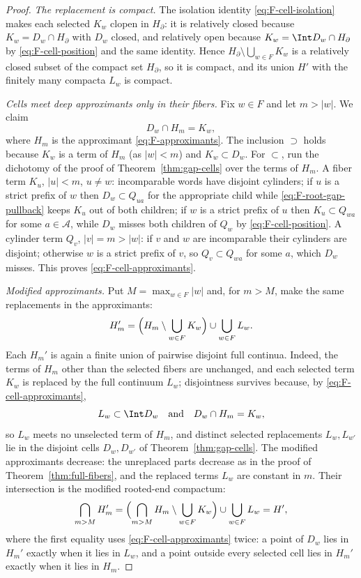 \begin{proof}
\emph{The replacement is compact.}
The isolation identity \eqref{eq:F-cell-isolation} makes each selected
$K_w$ clopen in $H_\partial$: it is relatively closed because
$K_w=D_w\cap H_\partial$ with $D_w$ closed, and relatively open because
$K_w=\Int D_w\cap H_\partial$ by \eqref{eq:F-cell-position} and the same
identity.  Hence $H_\partial\setminus\bigcup_{w\in F}K_w$ is a relatively
closed subset of the compact set $H_\partial$, so it is compact, and its
union $H'$ with the finitely many compacta $L_w$ is compact.

\emph{Cells meet deep approximants only in their fibers.}
Fix $w\in F$ and let $m>|w|$.  We claim
\begin{equation}\label{eq:F-cell-approximants}
D_w\cap H_m=K_w ,
\end{equation}
where $H_m$ is the approximant \eqref{eq:F-approximants}.  The inclusion
$\supset$ holds because $K_w$ is a term of $H_m$ (as $|w|<m$) and
$K_w\subset D_w$.  For $\subset$, run the dichotomy of the proof of
Theorem~\ref{thm:gap-cells} over the terms of $H_m$.  A fiber term $K_u$,
$|u|<m$, $u\ne w$: incomparable words have disjoint cylinders; if $u$ is
a strict prefix of $w$ then $D_w\subset Q_{ua}$ for the appropriate child
while \eqref{eq:F-root-gap-pullback} keeps $K_u$ out of both children; if
$w$ is a strict prefix of $u$ then $K_u\subset Q_{wa}$ for some
$a\in\mathcal A$, while $D_w$ misses both children of $Q_w$ by
\eqref{eq:F-cell-position}.  A cylinder term $Q_v$, $|v|=m>|w|$: if $v$
and $w$ are incomparable their cylinders are disjoint; otherwise $w$ is a
strict prefix of $v$, so $Q_v\subset Q_{wa}$ for some $a$, which $D_w$
misses.  This proves \eqref{eq:F-cell-approximants}.

\emph{Modified approximants.}
Put $M=\max_{w\in F}|w|$ and, for $m>M$, make the same replacements in
the approximants:
\[
H_m'
=\Bigl(H_m\setminus\bigcup_{w\in F}K_w\Bigr)
\cup\bigcup_{w\in F}L_w .
\]
Each $H_m'$ is again a finite union of pairwise disjoint full continua.
Indeed, the terms of $H_m$ other than the selected fibers are unchanged,
and each selected term $K_w$ is replaced by the full continuum $L_w$;
disjointness survives because, by \eqref{eq:F-cell-approximants},
\[
L_w\subset\Int D_w
\quad\text{and}\quad
D_w\cap H_m=K_w ,
\]
so $L_w$ meets no unselected term of $H_m$, and distinct selected
replacements $L_w,L_{w'}$ lie in the disjoint cells $D_w,D_{w'}$ of
Theorem~\ref{thm:gap-cells}.  The modified approximants decrease: the
unreplaced parts decrease as in the proof of
Theorem~\ref{thm:full-fibers}, and the replaced terms $L_w$ are constant
in $m$.  Their intersection is the modified rooted-end compactum:
\[
\bigcap_{m>M}H_m'
=\Bigl(\bigcap_{m>M}H_m\setminus\bigcup_{w\in F}K_w\Bigr)
\cup\bigcup_{w\in F}L_w
=H' ,
\]
where the first equality uses \eqref{eq:F-cell-approximants} twice: a
point of $D_w$ lies in $H_m'$ exactly when it lies in $L_w$, and a point
outside every selected cell lies in $H_m'$ exactly when it lies in
$H_m$.


\end{proof}
